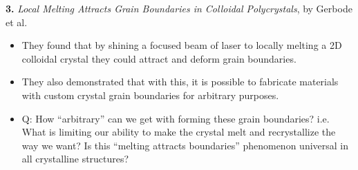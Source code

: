 \documentclass[11pt]{article}
\begin{document}
\noindent \textbf{3.} \textit{Local Melting Attracts Grain Boundaries in Colloidal Polycrystals}, by Gerbode et al. 
\begin{itemize}
	\item They found that by shining a focused beam of laser to locally melting a 2D colloidal crystal they could attract and deform grain boundaries. 
	\item They also demonstrated that with this, it is possible to fabricate materials with custom crystal grain boundaries for arbitrary purposes.
	\item Q: How ``arbitrary'' can we get with forming these grain boundaries? i.e. What is limiting our ability to make the crystal melt and recrystallize the way we want? Is this ``melting attracts boundaries'' phenomenon universal in all crystalline structures? 
\end{itemize}
 
  
\end{document}
